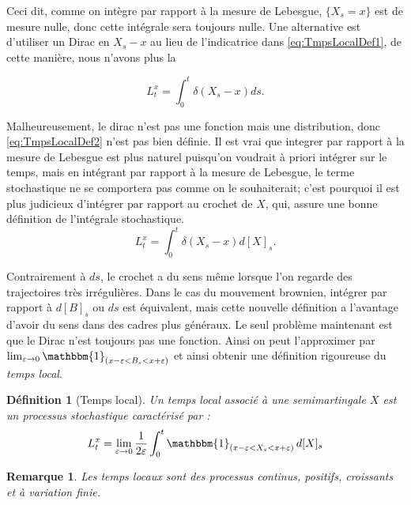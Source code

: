 \documentclass[openany]{book}
\newcommand{\1}{\mathbbm{1}}
\theoremstyle{thmfont}
\theoremstyle{deffont}
\newtheorem{definition}[definition]{Définition}
\theoremstyle{thmfont}
\theoremstyle{deffont}
\newtheorem*{remark}{Remarque}
\begin{document}
  Ceci dit, comme on intègre par rapport à la mesure de Lebesgue, $\{X_s = x\}$ est de mesure nulle, donc cette intégrale sera toujours nulle. Une alternative est d'utiliser un Dirac en $X_s - x$ au lieu de l'indicatrice dans \eqref{eq:TmpsLocalDef1}, de cette manière, nous n'avons plus la 


\begin{equation}
  \label{eq:TmpsLocalDef2}
  L^x_t= \int_0^t\delta(X_s-x)ds.
\end{equation}

Malheureusement, le dirac n'est pas une fonction mais une distribution, donc \eqref{eq:TmpsLocalDef2} n'est pas bien définie. Il est vrai que integrer par rapport à la mesure de Lebesgue est plus naturel puisqu'on voudrait à priori intégrer sur le temps, mais en intégrant par rapport à la mesure de Lebesgue, le terme stochastique ne se comportera pas comme on le souhaiterait; c'est pourquoi il est plus judicieux d'intégrer par rapport au crochet de $X$, qui, assure une bonne définition de l'intégrale stochastique. 
\begin{equation}
  \label{eq:TmpsLocalDef3}
  L^x_t= \int_0^t\delta(X_s-x)d[X]_s.
\end{equation}

Contrairement à $ds$, le crochet a du sens même lorsque l’on regarde des trajectoires très irrégulières. Dans le cas du mouvement brownien, intégrer par rapport à $d[B]_s$ ou $ds$ est équivalent, mais cette nouvelle définition a l'avantage d'avoir du sens dans des cadres plus généraux.
Le seul problème maintenant est que le Dirac n'est toujours pas une fonction. Ainsi on peut l'approximer par $\lim_{\varepsilon\to 0}  \1_{(x - \varepsilon < B_s < x + \varepsilon)}$ et ainsi obtenir une définition rigoureuse du \textit{temps local}.

\begin{definition}[Temps local] Un \textit{temps local} associé à une semimartingale $X$ est un processus stochastique caractérisé par :
\begin{equation*}
    L_t^x = \lim_{\varepsilon \to 0} \frac{1}{2\varepsilon} \int_0^t \1_{(x - \varepsilon < X_s < x + \varepsilon)} \, d[X]_s
\end{equation*}
\end{definition}

\begin{remark}
  Les temps locaux sont des processus \textit{continus}, \textit{positifs}, \textit{croissants} et à \textit{variation finie}.
\end{remark}
\end{document}
